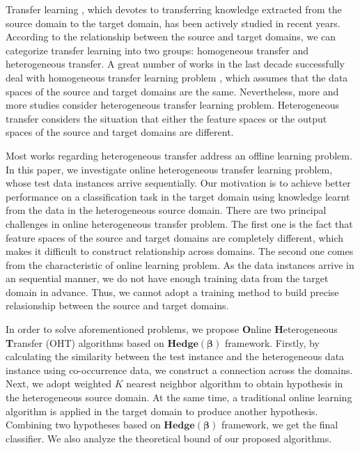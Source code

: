 \documentclass[letterpaper]{article}
\theoremstyle{remark}
\theoremstyle{definition}
\begin{document}
Transfer learning \cite{pan2010survey}, which devotes to transferring knowledge extracted from the source domain to the target domain, has been actively studied in recent years.
According to the relationship between the source and target domains, we can categorize transfer learning into two groups: homogeneous transfer and heterogeneous transfer.
A great number of works in the last decade successfully deal with homogeneous transfer learning problem \cite{liao2005logistic,dai2007boosting,dai2007transferring,eaton2011selective}, which assumes that the data spaces of the source and target domains are the same.
Nevertheless, more and more studies consider heterogeneous transfer learning problem.
Heterogeneous transfer considers the situation that either the feature spaces or the output spaces of the source and target domains are different.

Most works regarding heterogeneous transfer address an offline learning problem.
In this paper, we investigate online heterogeneous transfer learning problem, whose test data instances arrive sequentially.
Our motivation is to achieve better performance on a classification task in the target domain using knowledge learnt from the data in the heterogeneous source domain.
There are two principal challenges in online heterogeneous transfer problem.
The first one is the fact that feature spaces of the source and target domains are completely different, which makes it difficult to construct relationship across domains.
The second one comes from the characteristic of online learning problem.
As the data instances arrive in an sequential manner, we do not have enough training data from the target domain in advance.
Thus, we cannot adopt a training method to build precise relasionship between the source and target domains.

In order to solve aforementioned problems, we propose \textbf{O}nline \textbf{H}eterogeneous \textbf{T}ransfer (OHT) algorithms based on $\mathbf{Hedge(\beta)}$ framework.
Firstly, by calculating the similarity between the test instance and the heterogeneous data instance using co-occurrence data, we construct a connection across the domains.
Next, we adopt weighted $K$ nearest neighbor algorithm to obtain hypothesis in the heterogeneous source domain.
At the same time, a traditional online learning algorithm is applied in the target domain to produce another hypothesis.
Combining two hypotheses based on $\mathbf{Hedge(\beta)}$ framework, we get the final classifier.
We also analyze the theoretical bound of our proposed algorithms.
\end{document}
